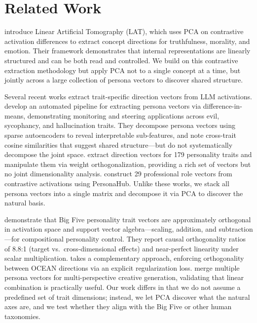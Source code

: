 \section{Related Work}
\label{sec:related}

\citet{zou2023representation} introduce Linear Artificial Tomography (LAT), which uses PCA on contrastive activation differences to extract concept directions for truthfulness, morality, and emotion. Their framework demonstrates that internal representations are linearly structured and can be both read and controlled. We build on this contrastive extraction methodology but apply PCA not to a single concept at a time, but jointly across a large collection of persona vectors to discover shared structure.

Several recent works extract trait-specific direction vectors from LLM activations. \citet{chen2025persona} develop an automated pipeline for extracting persona vectors via difference-in-means, demonstrating monitoring and steering applications across evil, sycophancy, and hallucination traits. They decompose persona vectors using sparse autoencoders to reveal interpretable sub-features, and note cross-trait cosine similarities that suggest shared structure---but do not systematically decompose the joint space. \citet{allbert2024identifying} extract direction vectors for 179 personality traits and manipulate them via weight orthogonalization, providing a rich set of vectors but no joint dimensionality analysis. \citet{poterti2025designing} construct 29 professional role vectors from contrastive activations using PersonaHub. Unlike these works, we stack all persona vectors into a single matrix and decompose it via PCA to discover the natural basis.

\citet{feng2026persona} demonstrate that Big Five personality trait vectors are approximately orthogonal in activation space and support vector algebra---scaling, addition, and subtraction---for compositional personality control. They report causal orthogonality ratios of 8.8:1 (target vs.\ cross-dimensional effects) and near-perfect linearity under scalar multiplication. \citet{wang2025geometry} takes a complementary approach, enforcing orthogonality between OCEAN directions via an explicit regularization loss. \citet{pai2025billy} merge multiple persona vectors for multi-perspective creative generation, validating that linear combination is practically useful. Our work differs in that we do not assume a predefined set of trait dimensions; instead, we let PCA discover what the natural axes are, and we test whether they align with the Big Five or other human taxonomies.

